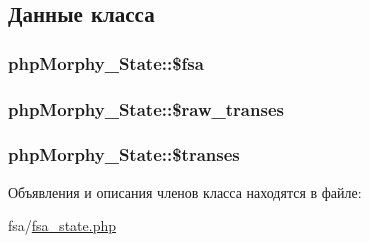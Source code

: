 \subsection{Данные класса}
\hypertarget{classphpMorphy__State_a72e54b687728b9920fefaa50ca3db195}{
\subsubsection[{\$fsa}]{\setlength{\rightskip}{0pt plus 5cm}phpMorphy\_\-State::\$fsa}}
\label{classphpMorphy__State_a72e54b687728b9920fefaa50ca3db195}
\hypertarget{classphpMorphy__State_aaf8a73718f71c4a0c6ff65bac440cc30}{
\subsubsection[{\$raw\_\-transes}]{\setlength{\rightskip}{0pt plus 5cm}phpMorphy\_\-State::\$raw\_\-transes}}
\label{classphpMorphy__State_aaf8a73718f71c4a0c6ff65bac440cc30}
\hypertarget{classphpMorphy__State_a105df0a0e8be41e05c31b5ed556c18c3}{
\subsubsection[{\$transes}]{\setlength{\rightskip}{0pt plus 5cm}phpMorphy\_\-State::\$transes}}
\label{classphpMorphy__State_a105df0a0e8be41e05c31b5ed556c18c3}


Объявления и описания членов класса находятся в файле:\begin{DoxyCompactItemize}
\item 
fsa/\hyperlink{fsa__state_8php}{fsa\_\-state.php}\end{DoxyCompactItemize}
